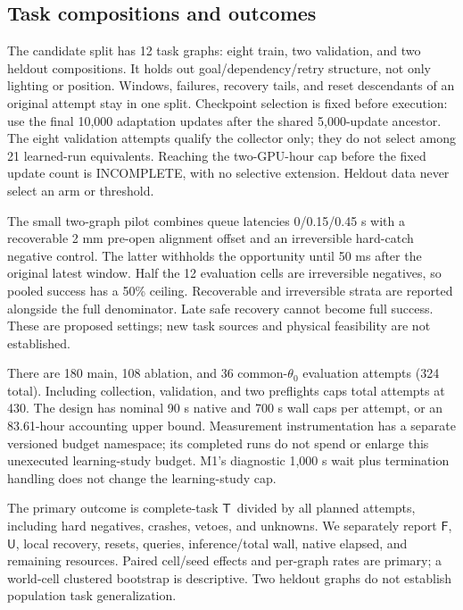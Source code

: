 \documentclass{article}
\newcommand{\True}{\ensuremath{\mathsf{T}}}
\newcommand{\False}{\ensuremath{\mathsf{F}}}
\newcommand{\Unk}{\ensuremath{\mathsf{U}}}
\begin{document}
\subsection{Task compositions and outcomes}
The candidate split has 12 task graphs: eight train, two validation, and two heldout compositions. It holds out goal/dependency/retry structure, not only lighting or position. Windows, failures, recovery tails, and reset descendants of an original attempt stay in one split. Checkpoint selection is fixed before execution: use the final 10,000 adaptation updates after the shared 5,000-update ancestor. The eight validation attempts qualify the collector only; they do not select among 21 learned-run equivalents. Reaching the two-GPU-hour cap before the fixed update count is INCOMPLETE, with no selective extension. Heldout data never select an arm or threshold.

The small two-graph pilot combines queue latencies 0/0.15/0.45 s with a recoverable 2 mm pre-open alignment offset and an irreversible hard-catch negative control. The latter withholds the opportunity until 50 ms after the original latest window. Half the 12 evaluation cells are irreversible negatives, so pooled success has a 50\% ceiling. Recoverable and irreversible strata are reported alongside the full denominator. Late safe recovery cannot become full success. These are proposed settings; new task sources and physical feasibility are not established.

There are 180 main, 108 ablation, and 36 common-\(\theta_0\) evaluation attempts (324 total). Including collection, validation, and two preflights caps total attempts at 430. The design has nominal 90 s native and 700 s wall caps per attempt, or an 83.61-hour accounting upper bound. Measurement instrumentation has a separate versioned budget namespace; its completed runs do not spend or enlarge this unexecuted learning-study budget. M1's diagnostic 1,000 s wait plus termination handling does not change the learning-study cap.

The primary outcome is complete-task \True\ divided by all planned attempts, including hard negatives, crashes, vetoes, and unknowns. We separately report \False, \Unk, local recovery, resets, queries, inference/total wall, native elapsed, and remaining resources. Paired cell/seed effects and per-graph rates are primary; a world-cell clustered bootstrap is descriptive. Two heldout graphs do not establish population task generalization.
\end{document}
